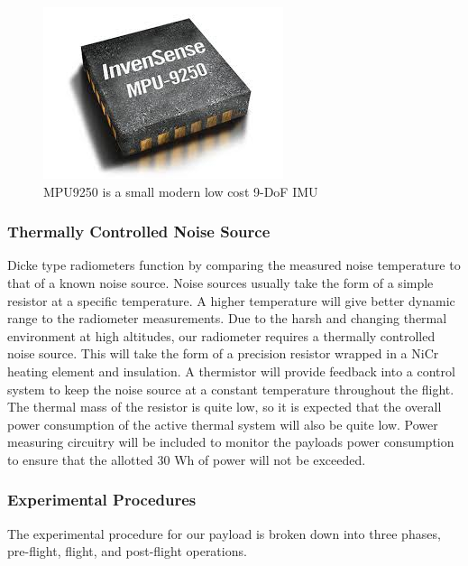 \documentclass[12pt]{article}
\begin{document}
\begin{figure}[h!]
	\centering
	\includegraphics[width=.4\linewidth]{Figures/IMU.jpg}
	\caption{MPU9250 is a small modern low cost 9-DoF IMU}
	\label{fig:imu}
\end{figure}

\subsubsection{Thermally Controlled Noise Source}

Dicke type radiometers function by comparing the measured noise temperature to that of a known noise source. Noise sources usually take the form of a simple resistor at a specific temperature. A higher temperature will give better dynamic range to the radiometer measurements. Due to the harsh and changing thermal environment at high altitudes, our radiometer requires a thermally controlled noise source. This will take the form of a precision resistor wrapped in a NiCr heating element and insulation. A thermistor will provide feedback into a control system to keep the noise source at a constant temperature throughout the flight. The thermal mass of the resistor is quite low, so it is expected that the overall power consumption of the active thermal system will also be quite low. Power measuring circuitry will be included to monitor the payloads power consumption to ensure that the allotted 30 Wh of power will not be exceeded.

\subsubsection{Experimental Procedures}

The experimental procedure for our payload is broken down into three phases, pre-flight, flight, and post-flight operations.
\end{document}
